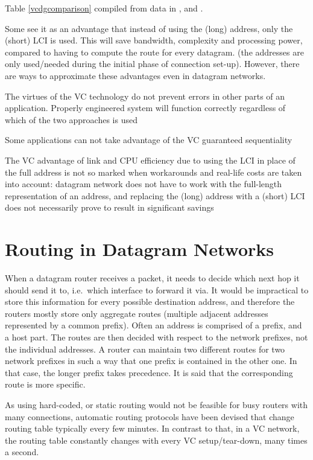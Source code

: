 \documentclass[10pt]{report}
\begin{document}
Table \ref{vcdgcomparison} compiled from data in \cite{kurose},
\cite[p298--299]{stallings} and \cite{russell}.

Some see it as an advantage that instead of using the (long) address,
only the (short) LCI is used.  This will save bandwidth, complexity and
processing power, compared to having to compute the route for every
datagram. \cite[p158]{russell} (the addresses are only used/needed
during the initial phase of connection set-up).  However, there are ways
to approximate these advantages even in datagram networks.

The virtues of the VC technology do not prevent errors in other parts of
an application.  Properly engineered system will function correctly
regardless of which of the two approaches is used \cite[p161]{russell}

Some applications can not take advantage of the VC guaranteed
sequentiality \cite[p161]{russell}

The VC advantage of link and CPU efficiency due to using the LCI in
place of the full address is not so marked when workarounds and
real-life costs are taken into account: datagram network does not have
to work with the full-length representation of an address, and replacing
the (long) address with a (short) LCI does not necessarily prove to
result in significant savings \cite[p161]{russell}

\section{Routing in Datagram Networks}

When a datagram router receives a packet, it needs to decide which next
hop it should send it to, i.e.\ which interface to forward it via.  It
would be impractical to store this information for every possible
destination address, and therefore the routers mostly store only
aggregate routes (multiple adjacent addresses represented by a common
prefix).  Often an address is
comprised of a prefix, and a host part.  The routes are then
decided with respect to the network prefixes, not the individual
addresses.  A router can maintain two different routes for two network
prefixes in such a way that one prefix is contained in the other one.
In that case, the longer prefix takes precedence.  It is said that the
corresponding route is more specific.

As using hard-coded, or static routing would not be feasible for busy
routers with many connections, automatic routing protocols have been
devised that change routing table typically every few minutes.  In
contrast to that, in a VC network, the routing table constantly changes
with every VC setup/tear-down, many times a second.
\end{document}
